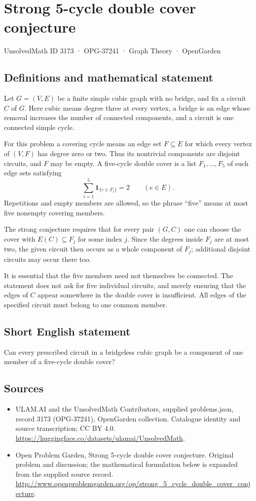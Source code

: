 \documentclass[11pt,a4paper]{article}
\begin{document}
\section*{Strong 5-cycle double cover conjecture}\label{3173}
{\small UnsolvedMath ID 3173 · OPG-37241 · Graph Theory · OpenGarden}
\subsection{Definitions and mathematical statement}
Let $G=(V,E)$ be a finite simple cubic graph with no bridge,
and fix a circuit $C$ of $G$. Here cubic means degree three
at every vertex, a bridge is an edge whose removal increases
the number of connected components, and a circuit is one
connected simple cycle.

For this problem a covering cycle means an edge set
$F\subseteq E$ for which every vertex of $(V,F)$ has degree
zero or two. Thus its nontrivial components are disjoint
circuits, and $F$ may be empty. A five-cycle double cover
is a list $F_1,\ldots,F_5$ of such edge sets satisfying
\[
 \sum_{i=1}^5\mathbf1_{\{e\in F_i\}}=2
 \qquad(e\in E).
\]
Repetitions and empty members are allowed, so the phrase
``five'' means at most five nonempty covering members.

The strong conjecture requires that for every pair $(G,C)$
one can choose the cover with $E(C)\subseteq F_j$ for some
index $j$. Since the degrees inside $F_j$ are at most two,
the given circuit then occurs as a whole component of
$F_j$; additional disjoint circuits may occur there too.

It is essential that the five members need not themselves
be connected. The statement does not ask for five individual
circuits, and merely ensuring that the edges of $C$ appear
somewhere in the double cover is insufficient. All edges
of the specified circuit must belong to one common member.
\subsection{Short English statement}
Can every prescribed circuit in a bridgeless cubic graph be a component of one member of a five-cycle double cover?
\subsection{Sources}
\begin{itemize}
\item[S1] ULAM.AI and the UnsolvedMath Contributors, supplied problems.json, record 3173 (OPG-37241), OpenGarden collection. Catalogue identity and source transcription; CC BY 4.0.
\url{https://huggingface.co/datasets/ulamai/UnsolvedMath}.
\item[S2] Open Problem Garden, Strong 5-cycle double cover conjecture. Original problem and discussion; the mathematical formulation below is expanded from the supplied source record.
\url{http://www.openproblemgarden.org/op/strong_5_cycle_double_cover_conjecture}.
\end{itemize}
\end{document}
